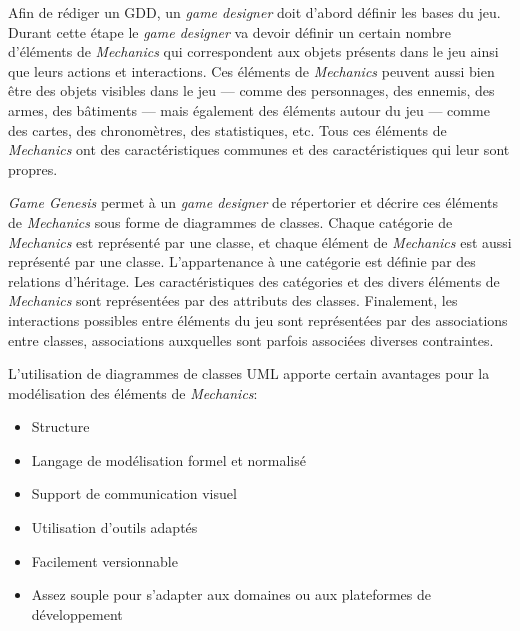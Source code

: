 




Afin de rédiger un GDD, un \emph{game designer} doit d'abord définir les bases du jeu.
Durant cette étape le \emph{game designer} va devoir définir un certain nombre d'\'el\'ements de \emph{Mechanics} qui correspondent aux objets présents dans le jeu ainsi que leurs actions et interactions.
Ces \'el\'ements de \emph{Mechanics} peuvent aussi bien être des objets visibles dans le jeu --- comme des personnages, des ennemis, des armes, des bâtiments --- mais également des \'el\'ements autour du jeu --- comme des cartes, des chronomètres, des statistiques, etc.
Tous ces \'el\'ements de \emph{Mechanics} ont des caractéristiques communes et des caractéristiques qui leur sont propres.

\emph{Game Genesis} permet à un \emph{game designer} de répertorier et décrire ces \'el\'ements de \emph{Mechanics} sous forme de diagrammes de classes.
Chaque catégorie de \emph{Mechanics} est représenté par une classe, et
chaque \'el\'ement de \emph{Mechanics} est aussi représenté par une classe.
L'appartenance à une catégorie est définie par des relations d'héritage.
Les caractéristiques des catégories et des divers \'el\'ements de \emph{Mechanics} sont représentées par des attributs des classes.
Finalement, les interactions possibles entre \'el\'ements du jeu sont représentées par des associations entre classes, associations auxquelles sont parfois associ\'ees diverses contraintes.

L'utilisation de diagrammes de classes UML apporte certain avantages pour la modélisation des \'el\'ements de \emph{Mechanics}:
\begin{itemize}
    \item Structure
    \item Langage de modélisation formel et normalisé
    \item Support de communication visuel 
    \item Utilisation d'outils adaptés
    \item Facilement versionnable
    \item Assez souple pour s'adapter aux domaines ou aux plateformes de développement 
\end{itemize}

